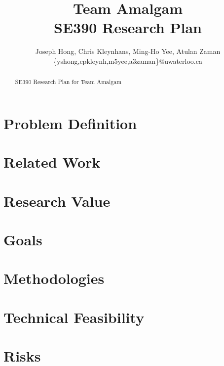 \documentclass[11pt]{article}
\title{{\Large Team Amalgam} \\ SE390 Research Plan}
\author{Joseph Hong, Chris Kleynhans, Ming-Ho Yee, Atulan Zaman \\
        \{yshong,cpkleynh,m5yee,a3zaman\}@uwaterloo.ca}
\begin{document}
\maketitle

\begin{abstract}

SE390 Research Plan for Team Amalgam~\cite{ref:moolloy}

\end{abstract}

\tableofcontents
\newpage

\section{Problem Definition}

\section{Related Work}

\section{Research Value}

\section{Goals}

\section{Methodologies}

\section{Technical Feasibility}

\section{Risks}
\end{document}
